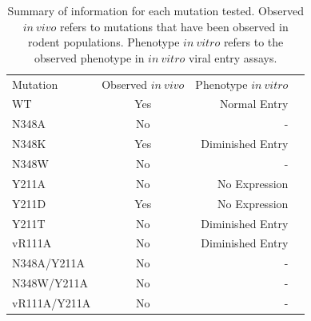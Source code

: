 \documentclass[12pt]{article}
\begin{document}
\clearpage
\begin {table}[H]
\caption{\label{tab:summary_mutants}Summary of information for each mutation tested. Observed $in~vivo$ refers to mutations that have been observed in rodent populations. Phenotype $in~vitro$ refers to the observed phenotype in $in~vitro$ viral entry assays.} 
\begin{center}
  \resizebox{11cm}{!} {
    \begin{tabular}{l c r r}
    \hline
      Mutation & Observed $in~vivo$ & Phenotype $in~vitro$ \\
            WT &                Yes &         Normal Entry \\
         N348A &                 No &                    - \\
         N348K &                Yes &     Diminished Entry \\
         N348W &                 No &                    - \\
         Y211A &                 No &        No Expression \\
         Y211D &                Yes &        No Expression \\
         Y211T &                 No &     Diminished Entry \\
        vR111A &                 No &     Diminished Entry \\
   N348A/Y211A &                 No &                    - \\
   N348W/Y211A &                 No &                    - \\
  vR111A/Y211A &                 No &                    - \\
    \hline
    \end{tabular}
  }
\end{center}
\end{table}
\end{document}
